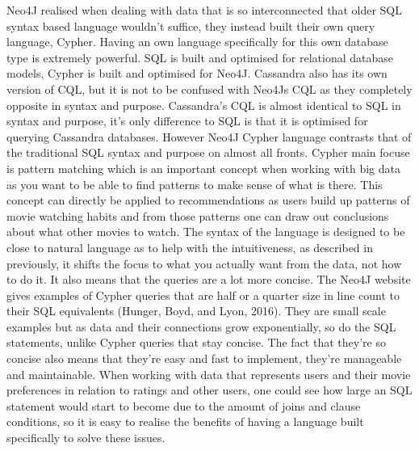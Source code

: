 \documentclass[a4paper]{article}
\begin{document}
Neo4J realised when dealing with data that is so interconnected that older SQL syntax based language wouldn't suffice, they instead built their own query language, Cypher. Having an own language specifically for this own database type is extremely powerful. SQL is built and optimised for relational database models, Cypher is built and optimised for Neo4J. Cassandra also has its own version of CQL, but it is not to be confused with Neo4Js CQL as they completely opposite in syntax and purpose. Cassandra's CQL is almost identical to SQL in syntax and purpose, it's only difference to SQL is that it is optimised for querying Cassandra databases. However Neo4J Cypher language contrasts that of the traditional SQL syntax and purpose on almost all fronts. Cypher main focuse is pattern matching which is an important concept when working with big data as you want to be able to find patterns to make sense of what is there. This concept can directly be applied to recommendations as users build up patterns of movie watching habits and from those patterns one can draw out conclusions about what other movies to watch. The syntax of the language is designed to be close to natural language as to help with the intuitiveness, as described in previously, it shifts the focus to what you actually want from the data, not how to do it. It also means that the queries are a lot more concise. The Neo4J website gives examples of Cypher queries that are half or a quarter size in line count to their SQL equivalents (Hunger, Boyd, and Lyon, 2016). They are small scale examples but as data and their connections grow exponentially, so do the SQL statements, unlike Cypher queries that stay concise. The fact that they're so concise also means that they're easy and fast to implement, they're manageable and maintainable. When working with data that represents users and their movie preferences in relation to ratings and other users, one could see how large an SQL statement would start to become due to the amount of joins and clause conditions, so it is easy to realise the benefits of having a language built specifically to solve these issues. \par
\end{document}

